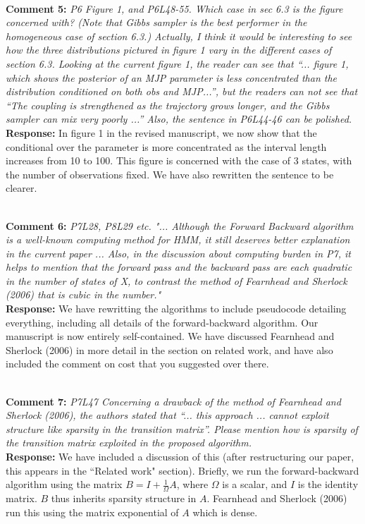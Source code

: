 \documentclass[11pt]{article}
\newcommand{\rev}[2]{\textbf{Comment #1: }\emph{#2}}
\newcommand{\resp}{\textbf{Response: }}
\begin{document}
~\\ 
\rev{5}{P6 Figure 1, and P6L48-55. Which case in sec 6.3 is the figure concerned with? (Note that Gibbs sampler is the best performer in the homogeneous case of section 6.3.) Actually, I think it would be interesting to see how the three distributions pictured in figure 1 vary in the different cases of section 6.3. Looking at the current figure 1, the reader can see that “... figure 1, which shows the posterior of an MJP parameter is less concentrated than the distribution conditioned on both obs and MJP...”, but the readers can not see that “The coupling is strengthened as the trajectory grows longer, and the Gibbs sampler can mix very poorly ...” 
Also, the sentence in P6L44-46 can be polished.}\\
\resp{ In figure 1 in the revised manuscript, we now show that the conditional over the parameter is more concentrated as the interval length increases from 10 to 100. This figure is concerned with the case of 3 states, with the number of observations fixed. We have also rewritten the sentence to be clearer.}

~\\
\noindent \rev{6}{P7L28, P8L29 etc. "... Although the Forward Backward algorithm is a well-known computing method for HMM, it still deserves better explanation in the current paper ...  Also, in the discussion about computing burden in P7, it helps to mention that the forward pass and the backward pass are each quadratic in the number of states of X, to contrast the method of Fearnhead and Sherlock (2006) that is cubic in the number."}
\\ 
\resp{We have rewritting the algorithms to include pseudocode detailing everything, including all details of the forward-backward algorithm. Our manuscript is now entirely self-contained. We have discussed Fearnhead and Sherlock (2006) in more detail in the section on related work, and have also included the comment on cost that you suggested over there.} 

~\\
\noindent \rev{7}{P7L47 Concerning a drawback of the method of Fearnhead and Sherlock (2006), the authors stated that “... this approach ... cannot exploit structure like sparsity in the transition matrix”. Please mention how is sparsity of the transition matrix exploited in the proposed algorithm.}
\\
\resp{We have included a discussion of this (after restructuring our paper, this appears in the ``Related work" section). Briefly, we run the forward-backward algorithm using the matrix $B = I + \frac{1}{\Omega}A$, where $\Omega$ is a scalar, and $I$ is the identity matrix. $B$ thus inherits sparsity structure in $A$. Fearnhead and Sherlock (2006) run this using the matrix exponential of $A$ which is dense.}
\end{document}
